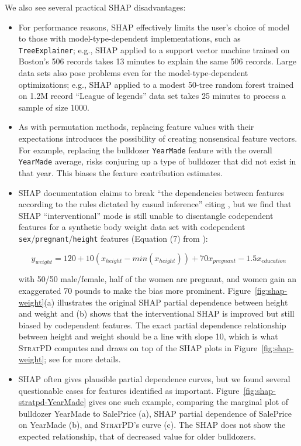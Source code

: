 \documentclass[11pt]{article}
\newcommand{\figref}[1]{Figure~\ref{#1}}
\newcommand{\todo}[1]{{{\color{red}{[#1]}}}}
\newcommand{\spd}{\fontfamily{cmr}\textsc{\small StratPD}}
\begin{document}
We also see several practical SHAP disadvantages:

\begin{itemize}
\item  For performance reasons, SHAP effectively limits the user's choice of model to those with model-type-dependent implementations, such as {\tt\small TreeExplainer}; e.g., SHAP applied to a support vector machine trained on Boston's 506 records takes 13 minutes to explain the same 506 records.  Large data sets also pose problems even for the model-type-dependent optimizations; e.g., SHAP applied to a modest 50-tree random forest trained on 1.2M record ``League of legends'' data set \citep{lol} takes 25 minutes to process a sample of size 1000.

\item As with permutation methods, replacing feature values with their expectations \todo{or random sample?} introduces the possibility of creating nonsensical feature vectors.  For example, replacing the bulldozer {\tt\small YearMade} feature with the overall {\tt\small YearMade} average, risks conjuring up a type of bulldozer that did not exist in that year. This biases the feature contribution estimates.

\item SHAP documentation claims to break ``the dependencies between features according to the rules dictated by casual inference'' citing \citet{janzing2019feature}, but we find that SHAP ``interventional'' mode is still unable to disentangle codependent features for a synthetic body weight data set with codependent {\tt\small sex}/{\tt\small pregnant}/{\tt\small height} features (Equation (7) from \citealt{stratpd}):

\begin{equation}\label{eq:weight}
y_{weight}  = 120 + 10(x_{height} - min(x_{height})) + 70x_{pregnant} - 1.5x_{education}
\end{equation}

\noindent with 50/50 male/female, half of the women are pregnant, and women gain an exaggerated 70 pounds to make the bias more prominent. \figref{fig:shap-weight}(a) illustrates the original SHAP partial dependence between height and weight and (b) shows that the interventional SHAP is improved but still biased by codependent features.  The exact partial dependence relationship between height and weight should be a line with slope 10, which is what \spd{} computes and draws on top of the SHAP plots in \figref{fig:shap-weight}; see \citet{stratpd} for more details. \todo{right scale is from 0 not mean}

\item SHAP often gives plausible partial dependence curves, but we found several questionable cases for features identified as important. \figref{fig:shap-stratpd-YearMade} gives one such example, comparing the marginal plot of  bulldozer YearMade to SalePrice (a), SHAP partial dependence of SalePrice on YearMade (b), and \spd{}'s curve (c). The SHAP does not show the expected relationship, that of decreased value for older bulldozers. 

\end{itemize}
\end{document}
